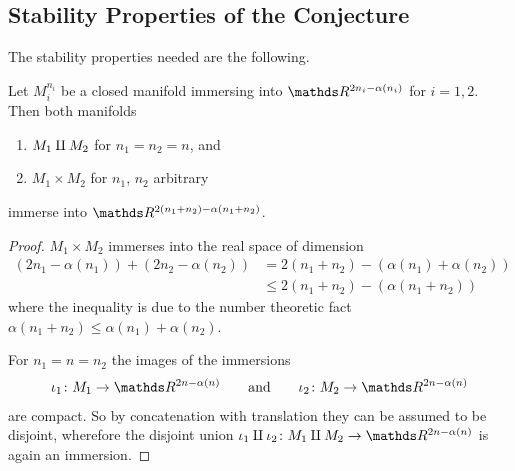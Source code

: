   \subsection{Stability Properties of the Conjecture}
  The stability properties needed are the following.
  \begin{Lem}\label{lem:brownstableunderringops}
    Let $M_i^{n_i}$ be a closed manifold immersing into
    $\R^{2n_i-\alpha(n_i)}$ for $i=1,2$.
    Then both manifolds
    \begin{enumerate}
    \item $M_1\amalg M_2$ for $n_1=n_2=n$, and
    \item $M_1\times M_2$ for $n_1$, $n_2$ arbitrary
    \end{enumerate}
    immerse into $\R^{2(n_1+n_2)-\alpha(n_1+n_2)}$.
    \begin{proof}
      $M_1\times M_2$ immerses into the real space of dimension
      \begin{align*}
        \left( 2n_1-\alpha(n_1) \right)
        + \left( 2n_2-\alpha(n_2) \right)
        &= 2(n_1+n_2) - \left(\alpha(n_1)+\alpha(n_2)\right)\\
        &\leq 2(n_1+n_2) - \left(\alpha(n_1 + n_2)\right)
      \end{align*}
      where the inequality is due to the number theoretic fact
      $\alpha(n_1+n_2) \leq \alpha(n_1)+\alpha(n_2)$.

      For $n_1=n=n_2$ the images of the immersions
      \begin{gather*}
        \iota_1\colon M_1\to\R^{2n-\alpha(n)}
        \qquad \text{and} \qquad
        \iota_2\colon M_2\to\R^{2n-\alpha(n)}
      \end{gather*}
      are compact. So by
      concatenation with translation they can be assumed to be disjoint,
      wherefore the disjoint union
      $\iota_1\disjointsum\iota_2\colon M_1\disjointsum M_2\to\R^{2n-\alpha(n)}$
      is again an immersion.
    \end{proof}
  \end{Lem}


